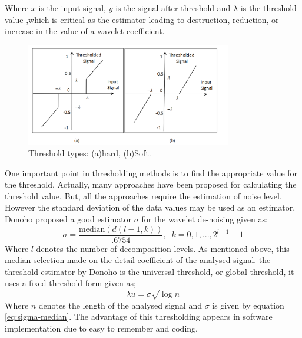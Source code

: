 \documentclass[12pt, a4paper, twoside]{report}
\begin{document}
Where $x$  is the input signal, $y$ is the signal after threshold and  $\lambda$ is the threshold value ,which is critical as the estimator leading to destruction, reduction, or increase in the value of a wavelet coefficient.

\begin{figure}[!h]
	\centering
	\includegraphics[width=0.8\textwidth]
	{images/chapter3/threshold-types}
	\caption{Threshold types: (a)hard, (b)Soft.}
	\label{fig:threshold-types}
\end{figure}

One important point in thresholding methods   is to find the appropriate value for the threshold. Actually, many approaches have   been proposed for calculating the threshold value. But, all the approaches require the estimation of   noise level. However the standard deviation of the data values may be used as an estimator, Donoho proposed a good estimator $\sigma$ for the wavelet de-noising given as;
\begin{equation}
\sigma = \frac{\text{median}(d (l-1,k))}{.6754}, \; \; k = 0, 1,...,2^{l-1} - 1
\label{eq:sigma-median}
\end{equation}
Where $l$ denotes the number of decomposition levels. As mentioned above, this median selection made on the detail coefficient of the analysed signal. 
the threshold estimator by Donoho is the  universal threshold, or global threshold, it uses a fixed threshold form given as;
\begin{equation}
\lambda u = \sigma \sqrt{\log n}
\end{equation}
Where $n$ denotes the length of the analysed signal and $\sigma$ is given by equation \ref{eq:sigma-median}. The advantage of this thresholding appears in software implementation due to easy to remember and coding.
\end{document}
